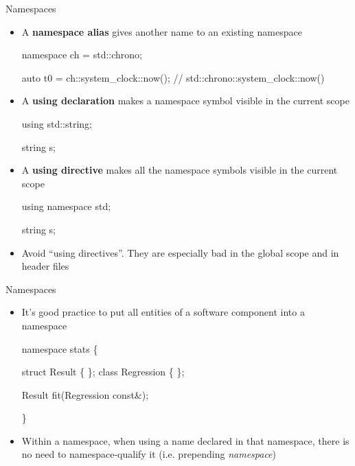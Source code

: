 \begin{frame}[fragile]{Namespaces \insertcontinuationtext}

  \begin{itemize}

  \item<1-> A \textbf{namespace alias} gives another name to an existing namespace
    \begin{codeblock}
namespace ch = std::chrono;

auto t0 = ch::system_clock::now(); // std::chrono::system_clock::now()\end{codeblock}
  \item<2-> A \textbf{using declaration} makes a namespace symbol visible in the
  current scope
    \begin{codeblock}
using std::string;

string s;\end{codeblock}
  \item<3-> A \textbf{using directive} makes \alert{all} the namespace symbols visible
  in the current scope
    \begin{codeblock}
using namespace std;

string s;\end{codeblock}

  \item<4-> Avoid ``using directives''. They are especially bad in the global scope
    and in header files
  \end{itemize}
\end{frame}

\begin{frame}[fragile]{Namespaces \insertcontinuationtext}

  \begin{itemize}
  \item It's good practice to put all entities of a software component into a namespace

    \begin{codeblock}
namespace stats \{

struct Result \{ \ddd \};
class Regression \{ \ddd \};

Result fit(Regression const&);

\}\end{codeblock}

  \item Within a namespace, when using a name declared in that namespace, there is
    no need to namespace-qualify it (i.e. prepending \textit{namespace}\code{::})
  \end{itemize}

\end{frame}

